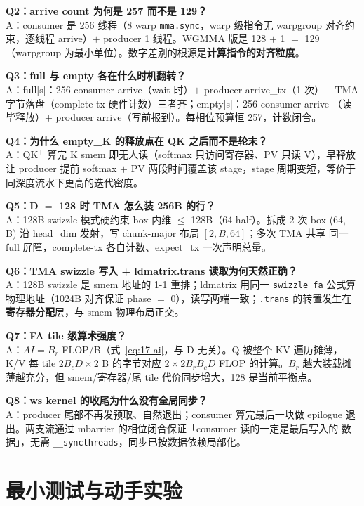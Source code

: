 \textbf{Q2：arrive count 为何是 257 而不是 129？}\\
A：consumer 是 256 线程（8 warp \texttt{mma.sync}，warp 级指令无 warpgroup
对齐约束，逐线程 arrive）$+$ producer 1 线程。WGMMA 版是 128 $+$ 1 $=$ 129
（warpgroup 为最小单位）。数字差别的根源是\textbf{计算指令的对齐粒度}。

\textbf{Q3：full 与 empty 各在什么时机翻转？}\\
A：full[s]：256 consumer arrive（wait 时）$+$ producer arrive\_tx（1 次）$+$
TMA 字节落盘（complete-tx 硬件计数）三者齐；empty[s]：256 consumer arrive
（读毕释放）$+$ producer arrive（写前报到）。每相位预算恒 257，计数闭合。

\textbf{Q4：为什么 empty\_K 的释放点在 QK 之后而不是轮末？}\\
A：QK$^\top$ 算完 K smem 即无人读（softmax 只访问寄存器、PV 只读 V），早释放
让 producer 提前 softmax $+$ PV 两段时间覆盖该 stage，stage 周期变短，等价于
同深度流水下更高的迭代密度。

\textbf{Q5：D $=$ 128 时 TMA 怎么装 256B 的行？}\\
A：128B swizzle 模式硬约束 box 内维 $\le$ 128B（64 half）。拆成 2 次 box
(64, B) 沿 head\_dim 发射，写 chunk-major 布局 $[2, B, 64]$；多次 TMA 共享
同一 full 屏障，complete-tx 各自计数、expect\_tx 一次声明总量。

\textbf{Q6：TMA swizzle 写入 + ldmatrix.trans 读取为何天然正确？}\\
A：128B swizzle 是 smem 地址的 1-1 重排；ldmatrix 用同一 \texttt{swizzle\_fa}
公式算物理地址（1024B 对齐保证 phase $=$ 0），读写两端一致；\texttt{.trans}
的转置发生在\textbf{寄存器分配}层，与 smem 物理布局正交。

\textbf{Q7：FA tile 级算术强度？}\\
A：$AI = B_r$ FLOP/B（式~\ref{eq:17-ai}，与 D 无关）。Q 被整个 KV 遍历摊薄，
K/V 每 tile $2 B_c D \times 2$ B 的字节对应 $2 \times 2 B_r B_c D$ FLOP 的计算。$B_r$
越大装载摊薄越充分，但 smem/寄存器/尾 tile 代价同步增大，128 是当前平衡点。

\textbf{Q8：ws kernel 的收尾为什么没有全局同步？}\\
A：producer 尾部不再发预取、自然退出；consumer 算完最后一块做 epilogue
退出。两支流通过 mbarrier 的相位闭合保证「consumer 读的一定是最后写入的
数据」，无需 \texttt{\_\allowbreak{}\_\allowbreak{}syncthreads}，同步已按数据依赖局部化。

\section{最小测试与动手实验}

